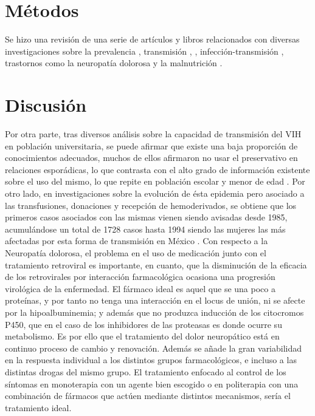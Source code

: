 \documentclass[a4paper,twocolumn,10pt]{article}
\begin{document}
\section{Métodos}
Se hizo una revisión de una serie de artículos y libros relacionados con diversas investigaciones sobre la prevalencia \cite{Marco2012}, transmisión \cite{LinaMariaVera2004}, \cite{Sepulveda-Amor1995}, infección-transmisión \cite{Castillo2004}, trastornos como la neuropatía dolorosa \cite{Ferri2002} y la malnutrición \cite{Herrera2004}. 
\section{Discusión}
Por otra parte, tras diversos análisis sobre la capacidad de transmisión del VIH en población universitaria, se puede afirmar que existe una baja proporción de conocimientos adecuados, muchos de ellos afirmaron no usar el preservativo en relaciones esporádicas, lo que contrasta con el alto grado de información existente sobre el uso del mismo, lo que repite en población escolar y menor de edad \cite{LinaMariaVera2004}. \newline
Por otro lado, en investigaciones sobre la evolución de ésta epidemia pero asociado a las transfusiones, donaciones y recepción de hemoderivados, se obtiene que los primeros casos asociados con las mismas vienen siendo avisadas desde 1985, acumulándose un total de 1728 casos hasta 1994 siendo  las mujeres las más afectadas por esta forma de transmisión en México \cite{Sepulveda-Amor1995}. \newline \newline
Con respecto a la Neuropatía dolorosa, el problema en el uso de medicación junto con el tratamiento retroviral es importante, en cuanto, que la disminución de la eficacia de los retrovirales por interacción farmacológica ocasiona una progresión virológica de la enfermedad. El fármaco ideal es aquel que se una poco a proteínas, y por tanto no tenga una interacción en el locus de unión, ni se afecte por la hipoalbuminemia; y además que no produzca inducción de los citocromos P450, que en el caso de los inhibidores de las proteasas es donde ocurre su metabolismo. Es por ello que el tratamiento del dolor neuropático está en continuo proceso de cambio y renovación. Además se añade la gran variabilidad en la respuesta individual a los distintos grupos farmacológicos, e incluso a las distintas drogas del mismo grupo. El tratamiento enfocado al control de los síntomas en monoterapia con un agente bien escogido o en politerapia con una combinación de fármacos que actúen mediante distintos mecanismos, sería el tratamiento ideal.\newline \newline
\end{document}
